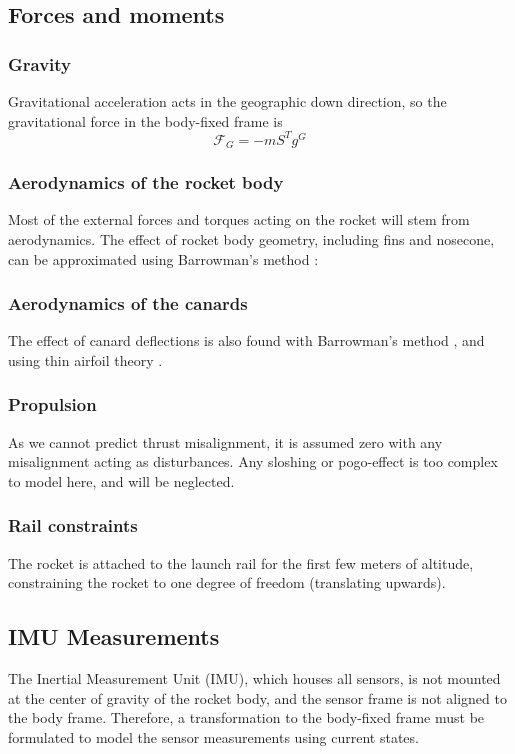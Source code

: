 \subsection{Forces and moments}
\subsubsection{Gravity}
Gravitational acceleration acts in the geographic down direction, so the gravitational force in the body-fixed frame is
\begin{equation}
    \mathcal{F}_G = -m S^T g^G
\end{equation}

\subsubsection{Aerodynamics of the rocket body}
Most of the external forces and torques acting on the rocket will stem from aerodynamics.
The effect of rocket body geometry, including fins and nosecone, can be approximated using Barrowman's method \cite{barrowman1967}:

\subsubsection{Aerodynamics of the canards}
The effect of canard deflections is also found with Barrowman's method \cite{barrowman1967}, and using thin airfoil theory \cite{stengel2004}.

\subsubsection{Propulsion}
As we cannot predict thrust misalignment, it is assumed zero with any misalignment acting as disturbances.
Any sloshing or pogo-effect is too complex to model here, and will be neglected.

\subsubsection{Rail constraints}
The rocket is attached to the launch rail for the first few meters of altitude, constraining the rocket to one degree of freedom (translating upwards).

\subsection{IMU Measurements}
\label{sec:model-measurements}
The Inertial Measurement Unit (IMU), which houses all sensors, is not mounted at the center of gravity of the rocket body, and the sensor frame is not aligned to the body frame.
Therefore, a transformation to the body-fixed frame must be formulated to model the sensor measurements using current states.

